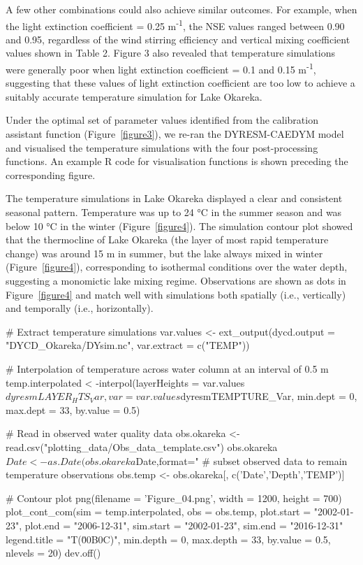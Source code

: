 A few other combinations could also achieve similar outcomes. For example, when the light extinction coefficient = 0.25 m\textsuperscript{-1}, the NSE values ranged between 0.90 and 0.95, regardless of the wind stirring efficiency and vertical mixing coefficient values shown in Table 2. Figure 3 also revealed that temperature simulations were generally poor when light extinction coefficient = 0.1 and 0.15 m\textsuperscript{-1}, suggesting that these values of light extinction coefficient are too low to achieve a suitably accurate temperature simulation for Lake Okareka.\par

Under the optimal set of parameter values identified from the calibration assistant function (Figure~\ref{figure3}), we re-ran the DYRESM-CAEDYM model and visualised the temperature simulations with the four post-processing functions. An example R code for visualisation functions is shown preceding the corresponding figure.\par

The temperature simulations in Lake Okareka displayed a clear and consistent seasonal pattern. Temperature was up to 24 °C in the summer season and was below 10 °C in the winter (Figure~\ref{figure4}). The simulation contour plot showed that the thermocline of Lake Okareka (the layer of most rapid temperature change) was around 15 m in summer, but the lake always mixed in winter (Figure~\ref{figure4}), corresponding to isothermal conditions over the water depth, suggesting a monomictic lake mixing regime. Observations are shown as dots in Figure~\ref{figure4} and match well with simulations both spatially (i.e., vertically) and temporally (i.e., horizontally).\par

\begin{example}
    # Extract temperature simulations
    var.values <- ext_output(dycd.output = "DYCD_Okareka/DYsim.nc",
                             var.extract = c("TEMP"))

    # Interpolation of temperature across water column at an interval of 0.5 m
    temp.interpolated < -interpol(layerHeights = var.values$dyresmLAYER_HTS_Var,
                                  var = var.values$dyresmTEMPTURE_Var,
                                  min.dept = 0, max.dept = 33, by.value = 0.5)

    # Read in observed water quality data
    obs.okareka <- read.csv("plotting_data/Obs_data_template.csv")
    obs.okareka$Date <- as.Date(obs.okareka$Date,format="%
    # subset observed data to remain temperature observations
    obs.temp <- obs.okareka[, c('Date','Depth','TEMP')] 

    # Contour plot
    png(filename = 'Figure_04.png', width = 1200, height = 700)
    plot_cont_com(sim = temp.interpolated,
                  obs = obs.temp,
                  plot.start = "2002-01-23",
                  plot.end = "2006-12-31",
                  sim.start = "2002-01-23",
                  sim.end = "2016-12-31"
                  legend.title = "T\n(\u00B0C)",
                  min.depth = 0,
                  max.depth = 33,
                  by.value = 0.5,
                  nlevels = 20)
    dev.off()
\end{example}

